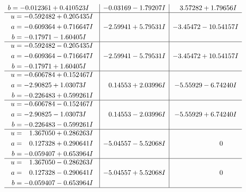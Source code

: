 \documentclass[1p]{elsarticle_modified}
\theoremstyle{definition}
\begin{document}
$$\begin{array}{c|c|c}
\begin{aligned}
b &= -0.012361 + 0.410523 I\end{aligned}
 & -0.03169 - 1.79207 I & \phantom{-}3.57282 + 1.79656 I \\ \hline\begin{aligned}
u &= -0.592482 + 0.205435 I \\
a &= -0.609364 + 0.716647 I \\
b &= -0.17971 - 1.60405 I\end{aligned}
 & -2.59941 + 5.79531 I & -3.45472 - 10.54157 I \\ \hline\begin{aligned}
u &= -0.592482 - 0.205435 I \\
a &= -0.609364 - 0.716647 I \\
b &= -0.17971 + 1.60405 I\end{aligned}
 & -2.59941 - 5.79531 I & -3.45472 + 10.54157 I \\ \hline\begin{aligned}
u &= -0.606784 + 0.152467 I \\
a &= -2.90825 + 1.03073 I \\
b &= -0.226483 + 0.599261 I\end{aligned}
 & \phantom{-}0.14553 + 2.03996 I & -5.55929 - 6.74240 I \\ \hline\begin{aligned}
u &= -0.606784 - 0.152467 I \\
a &= -2.90825 - 1.03073 I \\
b &= -0.226483 - 0.599261 I\end{aligned}
 & \phantom{-}0.14553 - 2.03996 I & -5.55929 + 6.74240 I \\ \hline\begin{aligned}
u &= \phantom{-}1.367050 + 0.286263 I \\
a &= \phantom{-}0.127328 + 0.290641 I \\
b &= -0.059407 + 0.653964 I\end{aligned}
 & -5.04557 - 5.52068 I & \phantom{-0.000000 } 0 \\ \hline\begin{aligned}
u &= \phantom{-}1.367050 - 0.286263 I \\
a &= \phantom{-}0.127328 - 0.290641 I \\
b &= -0.059407 - 0.653964 I\end{aligned}
 & -5.04557 + 5.52068 I & \phantom{-0.000000 } 0\\
 \hline 
 \end{array}$$\newpage$$\begin{array}{c|c|c}  

\end{array}$$
\end{document}
